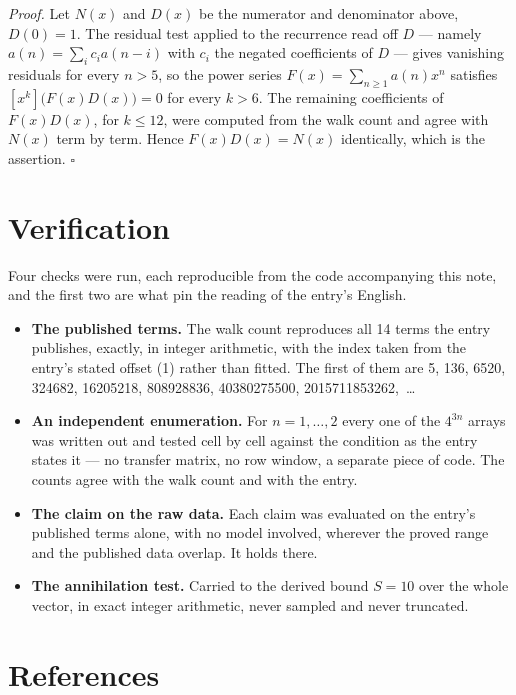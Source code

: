 \documentclass[11pt]{article}
\theoremstyle{definition}
\begin{document}
{\itshape Proof.} Let $N(x)$ and $D(x)$ be the numerator and denominator above, $D(0)=1$. The residual test applied to the recurrence read off $D$ --- namely $a(n) = \sum_i c_i a(n-i)$ with $c_i$ the negated coefficients of $D$ --- gives vanishing residuals for every $n > 5$, so the power series $F(x)=\sum_{n\ge 1}a(n)x^n$ satisfies $[x^k]\bigl(F(x)D(x)\bigr) = 0$ for every $k > 6$. The remaining coefficients of $F(x)D(x)$, for $k \le 12$, were computed from the walk count and agree with $N(x)$ term by term. Hence $F(x)D(x) = N(x)$ identically, which is the assertion. $\square$

\section{Verification}

Four checks were run, each reproducible from the code accompanying this note, and the first two are what pin the reading of the entry's English.

\begin{itemize}

\item {\bfseries The published terms.} The walk count reproduces all 14 terms the entry publishes, exactly, in integer arithmetic, with the index taken from the entry's stated offset (1) rather than fitted. The first of them are 5, 136, 6520, 324682, 16205218, 808928836, 40380275500, 2015711853262,~\dots

\item {\bfseries An independent enumeration.} For $n = 1,\dots,2$ every one of the $4^{3n}$ arrays was written out and tested cell by cell against the condition as the entry states it --- no transfer matrix, no row window, a separate piece of code. The counts agree with the walk count and with the entry.

\item {\bfseries The claim on the raw data.} Each claim was evaluated on the entry's published terms alone, with no model involved, wherever the proved range and the published data overlap. It holds there.

\item {\bfseries The annihilation test.} Carried to the derived bound $S = 10$ over the whole vector, in exact integer arithmetic, never sampled and never truncated.

\end{itemize}

\section{References}
\end{document}
